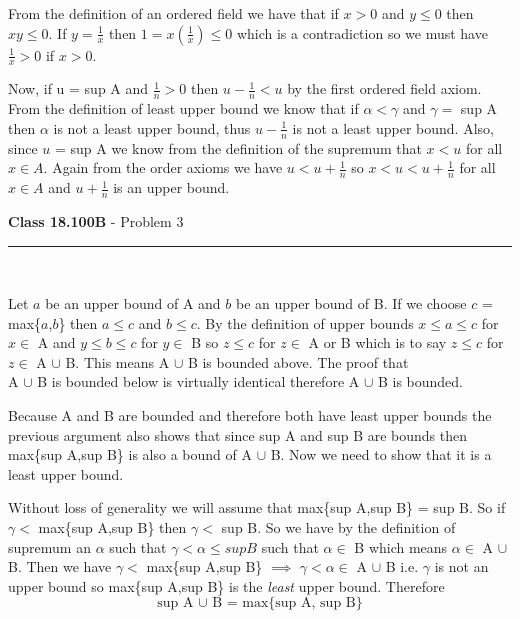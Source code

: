 \documentclass[11pt,reqno]{article}
\begin{document}
From the definition of an ordered field we have that if $x > 0$ and $y \le 0$ then $x y \le 0$. If $y = \frac{1}{x}$ then $1 = x(\frac{1}{x}) \le 0$ which is a contradiction so we must have $\frac{1}{x}>0$ if $x>0$.

Now, if u = sup A and $\frac{1}{n} > 0$ then $u - \frac{1}{n} < u$ by the first ordered field axiom. From the definition of least upper bound we know that if $\alpha < \gamma$ and $\gamma =  $ sup A then $\alpha$ is not a least upper bound, thus $u - \frac{1}{n}$ is not a least upper bound. Also, since $u$ = sup A we know from the definition of the supremum that $x < u$ for all $x \in A$. Again from the order axioms we have $u < u + \frac{1}{n}$ so  $x < u < u + \frac{1}{n}$ for all $x \in A$ and $u + \frac{1}{n}$ is an upper bound.


\newpage

\vspace{15pt}
\begin{flushleft} 
\textbf{Class 18.100B} - Problem 3\\
\rule{500pt}{1pt}\\
\end{flushleft} 

Let $a$ be an upper bound of A and $b$ be an upper bound of B. If we choose $c$ = max\{$a$,$b$\} then $a \le c$ and $b \le c$. By the definition of upper bounds $x \le a \le c$ for $x \in$ A and $y \le b \le c$ for $y \in$ B so $z \le c$ for $z \in$ A or B which is to say $z \le c$ for $z \in$ A $\cup$ B. This means A $\cup$ B is bounded above. The proof that \\ A $\cup$ B is bounded below is virtually identical therefore A $\cup$ B is bounded.

Because A and B are bounded and therefore both have least upper bounds the previous argument also shows that since sup A and sup B are bounds then max\{sup A,sup B\} is also a bound of A $\cup$ B. Now we need to show that it is a least upper bound.

Without loss of generality we will assume that max\{sup A,sup B\} = sup B. So if \\$\gamma < $ max\{sup A,sup B\} then $\gamma < $ sup B. So we have by the definition of supremum an $\alpha$ such that
$\gamma < \alpha \le sup B$ such that $\alpha \in$ B which means $\alpha \in$ A $\cup$ B. Then we have $\gamma < $ max\{sup A,sup B\} $\implies$ $\gamma < \alpha \in$ A $\cup$ B i.e. $\gamma$ is not an upper bound so max\{sup A,sup B\} is the \textit{least} upper bound. Therefore
\[
\text{sup A $\cup$ B = max\{sup A, sup B\}}
\]
\end{document}
